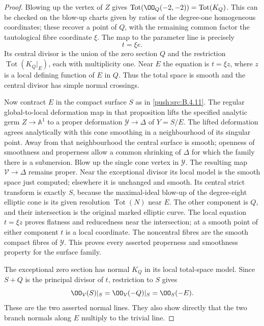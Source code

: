 \begin{proof}
Blowing up the vertex of $Z$ gives
$\operatorname{Tot}(\OO_Q(-2,-2))=\operatorname{Tot}(K_Q)$.
This can be checked on the blow-up charts given by ratios of the
degree-one homogeneous coordinates; these recover a point of
$Q$, with the remaining common factor the tautological fibre
coordinate $\xi$.
The map to the parameter line is precisely
\[
 t=\xi e.
\]
Its central divisor is the union of the zero section $Q$ and
the restriction $\operatorname{Tot}(K_Q|_E)$, each with
multiplicity one.  Near $E$ the equation is $t=\xi z$, where
$z$ is a local defining function of $E$ in $Q$.
Thus the total space is smooth and the central divisor has
simple normal crossings.

Now contract $E$ in the compact surface $S$ as in \ref{push:src:B.4.11}.
The regular global-to-local deformation map in that proposition
lifts the specified analytic germ $Z\to\mathbb A^1$ to a proper
deformation $\mathcal Y\to\Delta$ of $Y=S/E$.
The lifted deformation agrees analytically with this cone
smoothing in a neighbourhood of its singular point.
Away from that neighbourhood the central surface is smooth;
openness of smoothness and properness allow a common shrinking
of $\Delta$ for which the family there is a submersion.
Blow up the single cone vertex in $\mathcal Y$.
The resulting map $\mathcal V\to\Delta$ remains proper.
Near the exceptional divisor its local model is the smooth
space just computed; elsewhere it is unchanged and smooth.
Its central strict transform is exactly $S$, because the
maximal-ideal blow-up of the degree-eight elliptic cone is its
given resolution $\operatorname{Tot}(N)$ near $E$.
The other component is $Q$, and their intersection is the original
marked elliptic curve.  The local equation $t=\xi z$ proves
flatness and reducedness near the intersection; at a smooth
point of either component $t$ is a local coordinate.
The noncentral fibres are the smooth compact fibres of
$\mathcal Y$.
This proves every asserted properness and smoothness property
for the surface family.

The exceptional zero section has normal $K_Q$ in its local
total-space model.  Since $S+Q$ is the principal divisor of $t$,
restriction to $S$ gives
\[
 \OO_{\mathcal V}(S)|_S
   =\OO_{\mathcal V}(-Q)|_S=\OO_S(-E).
\]
These are the two asserted normal lines.  They also show directly
that the two branch normals along $E$ multiply to the trivial line.


\end{proof}
